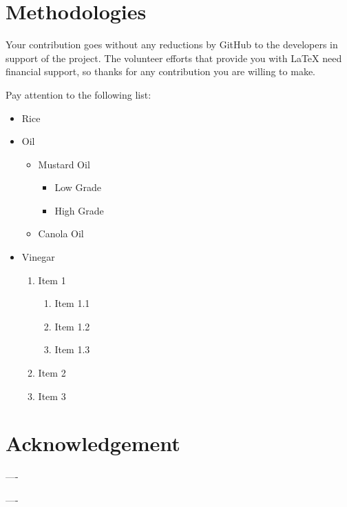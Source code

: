 \documentclass[12pt, a4paper]{article}
\begin{document}
    \section{Methodologies}
    Your contribution goes without any reductions by GitHub to the developers in support of the project. The volunteer efforts that provide you with LaTeX need financial support, so thanks for any contribution you are willing to make.

    \pagebreak
    Pay attention to the following list:

    \begin{itemize}
        \item Rice
        \item Oil
        \begin{itemize}
            \item Mustard Oil
            \begin{itemize}
                \item Low Grade
                \item High Grade
            \end{itemize}
            \item Canola Oil
        \end{itemize}
        \item Vinegar
        \begin{enumerate}
            \item Item 1
            \begin{enumerate}
                \item Item 1.1
                \item Item 1.2
                \item Item 1.3
            \end{enumerate}
            \item Item 2
            \item Item 3
        \end{enumerate}
    \end{itemize}

    \newpage
    \section*{Acknowledgement}
    \begin{center}
        \lipsum[3-4]
    \end{center}
    ----
    \begin{Center}
        \lipsum[3-4]
    \end{Center}
    
    \newpage
    \begin{raggedright}
        \lipsum[3-4]
    \end{raggedright}
    
    ----
    
    \begin{RaggedRight}
        \lipsum[3-4]
    \end{RaggedRight}
\end{document}
